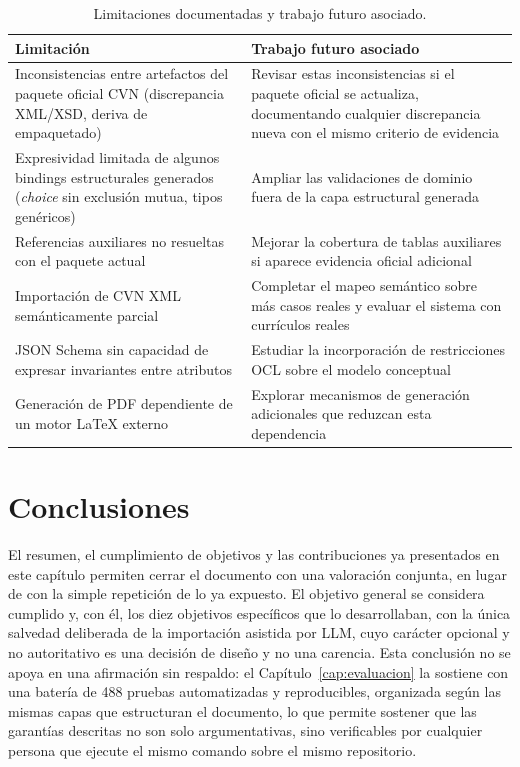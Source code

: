\begin{table}[htbp]
  \centering
  \footnotesize
  \renewcommand{\arraystretch}{1.55}
  \caption{Limitaciones documentadas y trabajo futuro asociado.}
  \label{tab:conclusiones_limitaciones}
  \begin{tabular}{p{} p{}}
    \hline
    \textbf{Limitación} & \textbf{Trabajo futuro asociado} \\
    \hline
    Inconsistencias entre artefactos del paquete oficial CVN (discrepancia
    XML/XSD, deriva de empaquetado) & Revisar estas inconsistencias si el
    paquete oficial se actualiza, documentando cualquier discrepancia nueva
    con el mismo criterio de evidencia \\
    Expresividad limitada de algunos bindings estructurales generados
    (\textit{choice} sin exclusión mutua, tipos genéricos) & Ampliar las
    validaciones de dominio fuera de la capa estructural generada \\
    Referencias auxiliares no resueltas con el paquete actual & Mejorar la
    cobertura de tablas auxiliares si aparece evidencia oficial adicional \\
    Importación de CVN XML semánticamente parcial & Completar el mapeo
    semántico sobre más casos reales y evaluar el sistema con currículos
    reales \\
    JSON Schema sin capacidad de expresar invariantes entre atributos &
    Estudiar la incorporación de restricciones OCL sobre el modelo
    conceptual \\
    Generación de PDF dependiente de un motor LaTeX externo & Explorar
    mecanismos de generación adicionales que reduzcan esta dependencia \\
    \hline
  \end{tabular}
\end{table}

\section{Conclusiones}
\label{sec:conclusiones_finales}

El resumen, el cumplimiento de objetivos y las contribuciones ya
presentados en este capítulo permiten cerrar el documento con una
valoración conjunta, en lugar de con la simple repetición de lo ya
expuesto. El objetivo general se considera cumplido y, con él, los diez
objetivos
específicos que lo desarrollaban, con la única salvedad deliberada de la
importación asistida por LLM, cuyo carácter opcional y no autoritativo es
una decisión de diseño y no una carencia. Esta conclusión no se apoya en
una afirmación sin respaldo: el Capítulo~\ref{cap:evaluacion} la sostiene
con una batería de 488 pruebas automatizadas y reproducibles, organizada
según las mismas capas que estructuran el documento, lo que permite
sostener que las garantías descritas no son solo argumentativas, sino
verificables por cualquier persona que ejecute el mismo comando sobre el
mismo repositorio.

